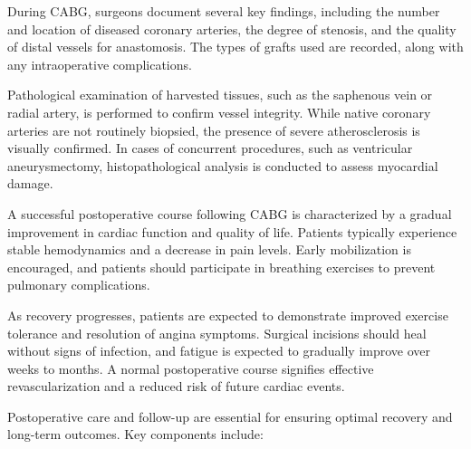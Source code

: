 During CABG, surgeons document several key findings, including the number and location of diseased coronary arteries, the degree of stenosis, and the quality of distal vessels for anastomosis. The types of grafts used are recorded, along with any intraoperative complications.

Pathological examination of harvested tissues, such as the saphenous vein or radial artery, is performed to confirm vessel integrity. While native coronary arteries are not routinely biopsied, the presence of severe atherosclerosis is visually confirmed. In cases of concurrent procedures, such as ventricular aneurysmectomy, histopathological analysis is conducted to assess myocardial damage.

A successful postoperative course following CABG is characterized by a gradual improvement in cardiac function and quality of life. Patients typically experience stable hemodynamics and a decrease in pain levels. Early mobilization is encouraged, and patients should participate in breathing exercises to prevent pulmonary complications.

As recovery progresses, patients are expected to demonstrate improved exercise tolerance and resolution of angina symptoms. Surgical incisions should heal without signs of infection, and fatigue is expected to gradually improve over weeks to months. A normal postoperative course signifies effective revascularization and a reduced risk of future cardiac events.

Postoperative care and follow-up are essential for ensuring optimal recovery and long-term outcomes. Key components include:

